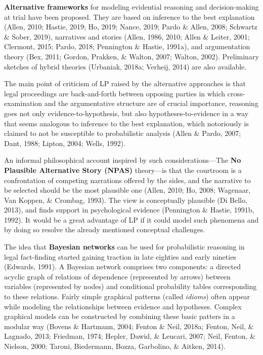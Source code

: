 \documentclass[11pt,dvipsnames,enabledeprecatedfontcommands]{scrartcl}
\begin{document}
\textbf{Alternative frameworks} for modeling evidential reasoning and
decision-making at trial have been proposed. They are based on inference
to the best explanation (Allen, 2010; Hastie, 2019; Ho, 2019; Nance,
2019; Pardo \& Allen, 2008; Schwartz \& Sober, 2019), narratives and
stories (Allen, 1986, 2010; Allen \& Leiter, 2001; Clermont, 2015;
Pardo, 2018; Pennington \& Hastie, 1991a), and argumentation theory
(Bex, 2011; Gordon, Prakken, \& Walton, 2007; Walton, 2002). Preliminary
sketches of hybrid theories (Urbaniak, 2018a; Verheij, 2014) are also
available.

The main point of criticism of LP raised by the alternative approaches
is that legal proceedings are back-and-forth between opposing parties in
which cross-examination and the argumentative structure are of crucial
importance, reasoning goes not only evidence-to-hypothesis, but also
hypotheses-to-evidence in a way that seems analogous to inference to the
best explanation, which notoriously is claimed to not be susceptible to
probabilistic analysis (Allen \& Pardo, 2007; Dant, 1988; Lipton, 2004;
Wells, 1992).

An informal philosophical account inspired by such considerations---The
\textbf{No Plausible Alternative Story (NPAS)} theory---is that the
courtroom is a confrontation of competing narrations offered by the
sides, and the narrative to be selected should be the most plausible one
(Allen, 2010; Ho, 2008; Wagenaar, Van Koppen, \& Crombag, 1993). The
view is conceptually plausible (Di Bello, 2013), and finds support in
psychological evidence (Pennington \& Hastie, 1991b, 1992). It would be
a great advantage of LP if it could model such phenomena and by doing so
resolve the already mentioned conceptual challenges.

The idea that \textbf{Bayesian networks} can be used for probabilistic
reasoning in legal fact-finding started gaining traction in late
eighties and early nineties (Edwards, 1991). A Bayesian network
comprises two components: a directed acyclic graph of relations of
dependence (represented by arrows) between variables (represented by
nodes) and conditional probability tables corresponding to these
relations. Fairly simple graphical patterns (called \emph{idioms}) often
appear while modeling the relationships between evidence and hypotheses.
Complex graphical models can be constructed by combining these basic
patters in a modular way (Bovens \& Hartmann, 2004; Fenton \& Neil,
2018a; Fenton, Neil, \& Lagnado, 2013; Friedman, 1974; Hepler, Dawid, \&
Leucari, 2007; Neil, Fenton, \& Nielson, 2000; Taroni, Biedermann,
Bozza, Garbolino, \& Aitken, 2014).
\end{document}
